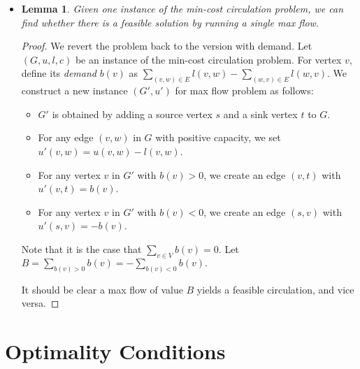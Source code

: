 \documentclass[10pt]{article}
\newtheorem{lemma}{Lemma}[section]
\begin{document}
\begin{itemize}
      \item 
        \begin{lemma}
          Given one instance of the min-cost circulation
          problem, we can find whether there is a \emph{feasible}
          solution by running a single max flow.
        \end{lemma}
        
        \begin{proof}
          We revert the problem back to the version with demand.
          Let $(G, u, l, c)$ be an instance of the min-cost circulation
          problem. For vertex $v$, define its \emph{demand} $b(v)$
          as $\sum_{(v,w) \in E} l(v,w) - \sum_{(w,v) \in E} l(w,v).$
          We construct a new instance $(G', u')$ for max flow problem 
          as follows:
          \begin{itemize}
            \item $G'$ is obtained by adding a source vertex $s$ and
              a sink vertex $t$ to $G$.
            \item For any edge $(v,w)$ in $G$ with positive capacity,
              we set $u'(v,w) = u(v,w) - l(v,w)$.
            \item For any vertex $v$ in $G'$ with $b(v) > 0$,
              we create an edge $(v,t)$ with $u'(v,t) = b(v)$.
            \item For any vertex $v$ in $G'$ with $b(v) < 0$,
              we create an edge $(s,v)$ with $u'(s,v) = -b(v)$.
          \end{itemize}
          
          Note that it is the case that $\sum_{v \in V} b(v) = 0.$
          Let $B = \sum_{b(v) > 0} b(v) = -\sum_{b(v) < 0} b(v).$
          
          It should be clear a max flow of value $B$ yields a 
          feasible circulation, and vice versa.
        \end{proof}
    \end{itemize}
  
  \section{Optimality Conditions} %
  \label{sec:optimality_conditions}
  
\end{document}
